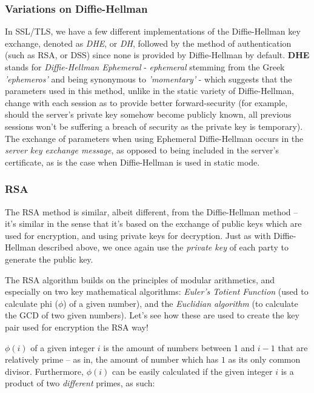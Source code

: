 \subsubsection[Variations on Diffie-Hellman]{Variations on Diffie-Hellman}
In SSL/TLS, we have a few different implementations of the Diffie-Hellman key exchange, denoted as \textit{DHE}, or \textit{DH}, followed by the method of authentication (such as RSA, or DSS) since none is provided by Diffie-Hellman by default.
\textbf{DHE} stands for \textit{Diffie-Hellman Ephemeral} - \textit{ephemeral} stemming from the Greek \textit{'ephemeros'} and being synonymous to \textit{'momentary'} - which suggests that the parameters used in this method, unlike in the static variety of Diffie-Hellman\cite{rfcDHstaticmode}, change with each session as to provide better forward-security (for example, should the server's private key somehow become publicly known, all previous sessions won't be suffering a breach of security as the private key is temporary). The exchange of parameters when using Ephemeral Diffie-Hellman occurs in the \textit{server key exchange message}\cite{rfcDHEparams}, as opposed to being included in the server's certificate, as is the case when Diffie-Hellman is used in static mode.


\subsubsection[RSA]{RSA}
The RSA method is similar, albeit different, from the Diffie-Hellman method -- it's similar in the sense that it's based on the exchange of public keys which are used for encryption, and using private keys for decryption.
Just as with Diffie-Hellman described above, we once again use the \textit{private key} of each party to generate the public key.

The RSA algorithm builds on the principles of modular arithmetics, and especially on two key mathematical algorithms: \textit{Euler's Totient Function} (used to calculate phi ($\phi$) of a given number), and the \textit{Euclidian algorithm} (to calculate the GCD of two given numbers). Let's see how these are used to create the key pair used for encryption the RSA way!\cite{rsaKeyGen}

$\phi(i)$ of a given integer $i$ is the amount of numbers between 1 and $i-1$ that are relatively prime -- as in, the amount of number which has $1$ as its only common divisor. Furthermore, $\phi(i)$ can be easily calculated if the given integer $i$ is a product of two \textit{different} primes, as such:

